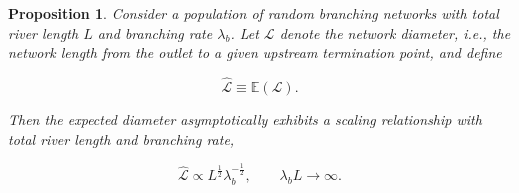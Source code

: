 \documentclass[11pt, class=article, crop=false]{standalone}
\newtheorem{proposition}{Proposition}[subsection]
\theoremstyle{definition}
\begin{document}
\begin{proposition}
\label{proposition-diameter}
Consider a population of random branching networks with total river length $L$ and branching rate $\lambda_b$.
Let $\mathcal{L}$ denote the network diameter, i.e., the network length from the outlet to a given upstream termination point, and define

\begin{equation}
    \hat{\mathcal{L}} \equiv \mathbb{E}(\mathcal{L}).
\end{equation}

Then the expected diameter asymptotically exhibits a scaling relationship with total river length and branching rate,

\begin{equation}
    \hat{\mathcal{L}}
    \propto
    L^{\frac{1}{2}}\lambda_b^{-\frac{1}{2}},
    \qquad
    \lambda_b L \to \infty.
\end{equation}

\end{proposition}
\end{document}
